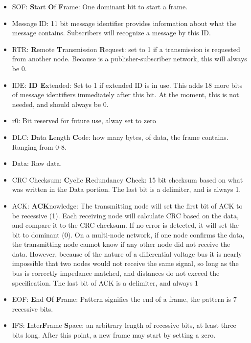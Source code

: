 
\begin{itemize}
	\item SOF: \textbf{S}tart \textbf{O}f \textbf{F}rame: One dominant bit to start a frame.
	\item Message ID: 11 bit message identifier provides information about what the message contains. Subscribers will recognize a message by this ID.
	\item RTR: \textbf{R}emote \textbf{T}ransmission \textbf{R}equest: set to 1 if a transmission is requested from another node. Because is a publisher-subscriber network, this will always be 0.
	\item IDE: \textbf{ID E}xtended: Set to 1 if extended ID is in use. This adds 18 more bits of message identifiers immediately after this bit. At the moment, this is not needed, and should always be 0.
	\item r0: Bit reserved for future use, alway set to zero
	\item DLC: \textbf{D}ata \textbf{L}ength \textbf{C}ode: how many bytes, of data, the frame contains. Ranging from 0-8.
	\item Data: Raw data. 
	\item CRC Checksum: \textbf{C}yclic \textbf{R}edundancy \textbf{C}heck: 15 bit checksum based on what was written in the Data portion. The last bit is a delimiter, and is always 1.
	\item ACK: \textbf{ACK}nowledge: The transmitting node will set the first bit of ACK to be recessive (1). Each receiving node will calculate CRC based on the data, and compare it to the CRC checksum. If no error is detected, it will set the bit to dominant (0). On a multi-node network, if one node confirms the data, the transmitting node cannot know if any other node did not receive the data. However, because of the nature of a differential voltage bus it is nearly impossible that two nodes would not receive the same signal, so long as the bus is correctly impedance matched, and distances do not exceed the specification. The last bit of ACK is a delimiter, and always 1
	\item EOF: \textbf{E}nd \textbf{O}f \textbf{F}rame: Pattern signifies the end of a frame, the pattern is 7 recessive bits.
	\item IFS: \textbf{I}nter\textbf{F}rame \textbf{S}pace: an arbitrary length of recessive bits, at least three bits long. After this point, a new frame may start by setting a zero.
\end{itemize}

